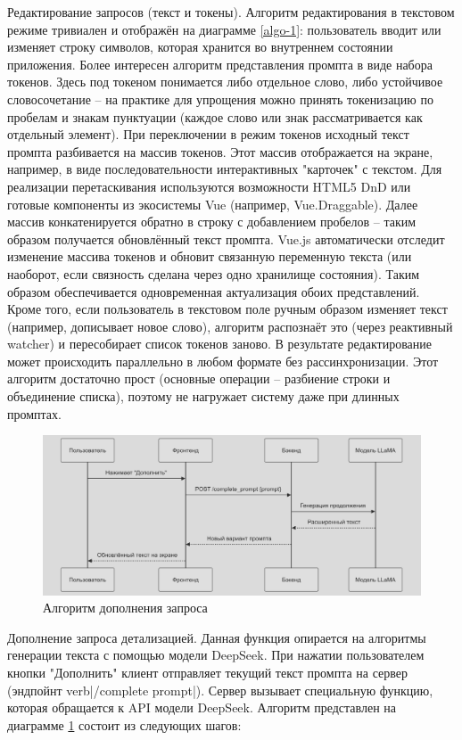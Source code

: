 Редактирование запросов (текст и токены). Алгоритм редактирования в текстовом режиме тривиален и отображён на диаграмме \ref{algo-1}: пользователь вводит или изменяет строку символов, которая хранится во внутреннем состоянии приложения. Более интересен алгоритм представления промпта в виде набора токенов. Здесь под токеном понимается либо отдельное слово, либо устойчивое словосочетание – на практике для упрощения можно принять токенизацию по пробелам и знакам пунктуации (каждое слово или знак рассматривается как отдельный элемент). При переключении в режим токенов исходный текст промпта разбивается на массив токенов. Этот массив отображается на экране, например, в виде последовательности интерактивных "карточек" с текстом. Для реализации перетаскивания используются возможности HTML5 DnD или готовые компоненты из экосистемы Vue (например, Vue.Draggable). Далее массив конкатенируется обратно в строку с добавлением пробелов – таким образом получается обновлённый текст промпта. Vue.js автоматически отследит изменение массива токенов и обновит связанную переменную текста (или наоборот, если связность сделана через одно хранилище состояния). Таким образом обеспечивается одновременная актуализация обоих представлений. Кроме того, если пользователь в текстовом поле ручным образом изменяет текст (например, дописывает новое слово), алгоритм распознаёт это (через реактивный watcher) и пересобирает список токенов заново. В результате редактирование может происходить параллельно в любом формате без рассинхронизации. Этот алгоритм достаточно прост (основные операции – разбиение строки и объединение списка), поэтому не нагружает систему даже при длинных промптах.
\begin{figure}[htbp]
    \centering
    \includegraphics[width=1\textwidth]{picture/diploma-inter-algo-2.png}
    \caption{Алгоритм дополнения запроса}
    \label{algo-2}
\end{figure}
Дополнение запроса детализацией. Данная функция опирается на алгоритмы генерации текста с помощью модели DeepSeek. При нажатии пользователем кнопки "Дополнить" клиент отправляет текущий текст промпта на сервер (эндпойнт verb|/complete prompt|). Сервер вызывает специальную функцию, которая обращается к API модели DeepSeek. Алгоритм представлен на диаграмме \ref{algo-2} состоит из следующих шагов:
